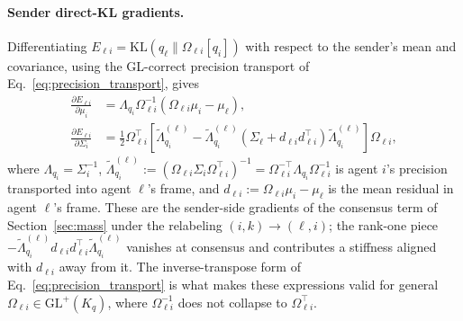 \documentclass[11pt]{article}
\begin{document}
\paragraph{Sender direct-KL gradients.}
Differentiating $E_{\ell i} = \mathrm{KL}(q_\ell \| \Omega_{\ell i}[q_i])$ with respect to the sender's mean and covariance, using the GL-correct precision transport of Eq.~\eqref{eq:precision_transport}, gives
\begin{align}
\frac{\partial E_{\ell i}}{\partial \mu_i} &= \Lambda_{q_i}\Omega_{\ell i}^{-1}\left(\Omega_{\ell i}\mu_i - \mu_\ell\right), \\
\frac{\partial E_{\ell i}}{\partial \Sigma_i} &= \frac{1}{2}\Omega_{\ell i}^{\top}\left[\tilde{\Lambda}_{q_i}^{(\ell)} - \tilde{\Lambda}_{q_i}^{(\ell)}\left(\Sigma_\ell + d_{\ell i}d_{\ell i}^{\top}\right)\tilde{\Lambda}_{q_i}^{(\ell)}\right]\Omega_{\ell i},
\end{align}
where $\Lambda_{q_i} = \Sigma_i^{-1}$, $\tilde{\Lambda}_{q_i}^{(\ell)} := (\Omega_{\ell i}\Sigma_i\Omega_{\ell i}^{\top})^{-1} = \Omega_{\ell i}^{-\top}\Lambda_{q_i}\Omega_{\ell i}^{-1}$ is agent $i$'s precision transported into agent $\ell$'s frame, and $d_{\ell i} := \Omega_{\ell i}\mu_i - \mu_\ell$ is the mean residual in agent $\ell$'s frame. These are the sender-side gradients of the consensus term of Section~\ref{sec:mass} under the relabeling $(i,k) \to (\ell, i)$; the rank-one piece $-\tilde{\Lambda}_{q_i}^{(\ell)}d_{\ell i}d_{\ell i}^{\top}\tilde{\Lambda}_{q_i}^{(\ell)}$ vanishes at consensus and contributes a stiffness aligned with $d_{\ell i}$ away from it. The inverse-transpose form of Eq.~\eqref{eq:precision_transport} is what makes these expressions valid for general $\Omega_{\ell i} \in \mathrm{GL}^{+}(K_q)$, where $\Omega_{\ell i}^{-1}$ does not collapse to $\Omega_{\ell i}^{\top}$.
\end{document}
